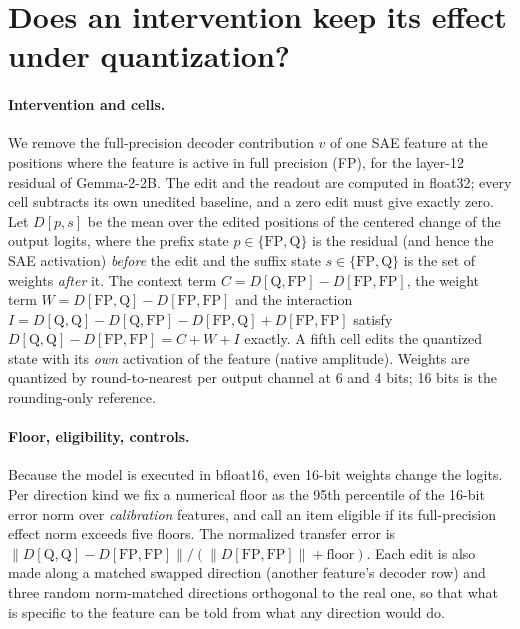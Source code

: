 \section{Does an intervention keep its effect under quantization?}
\label{sec:transfer}

\paragraph{Intervention and cells.}
We remove the full-precision decoder contribution $v$ of one SAE feature at the positions where the feature is active in full precision (FP), for the layer-12 residual of Gemma-2-2B. The edit and the readout are computed in float32; every cell subtracts its own unedited baseline, and a zero edit must give exactly zero. Let $D[p,s]$ be the mean over the edited positions of the centered change of the output logits, where the prefix state $p\in\{\mathrm{FP},\mathrm{Q}\}$ is the residual (and hence the SAE activation) \emph{before} the edit and the suffix state $s\in\{\mathrm{FP},\mathrm{Q}\}$ is the set of weights \emph{after} it. The context term $C=D[\mathrm{Q},\mathrm{FP}]-D[\mathrm{FP},\mathrm{FP}]$, the weight term $W=D[\mathrm{FP},\mathrm{Q}]-D[\mathrm{FP},\mathrm{FP}]$ and the interaction $I=D[\mathrm{Q},\mathrm{Q}]-D[\mathrm{Q},\mathrm{FP}]-D[\mathrm{FP},\mathrm{Q}]+D[\mathrm{FP},\mathrm{FP}]$ satisfy $D[\mathrm{Q},\mathrm{Q}]-D[\mathrm{FP},\mathrm{FP}]=C+W+I$ exactly. A fifth cell edits the quantized state with its \emph{own} activation of the feature (native amplitude). Weights are quantized by round-to-nearest per output channel at 6 and 4 bits; 16 bits is the rounding-only reference.

\paragraph{Floor, eligibility, controls.}
Because the model is executed in bfloat16, even 16-bit weights change the logits. Per direction kind we fix a numerical floor as the 95th percentile of the 16-bit error norm over \emph{calibration} features, and call an item eligible if its full-precision effect norm exceeds five floors. The normalized transfer error is $\lVert D[\mathrm{Q},\mathrm{Q}]-D[\mathrm{FP},\mathrm{FP}]\rVert/(\lVert D[\mathrm{FP},\mathrm{FP}]\rVert+\text{floor})$. Each edit is also made along a matched swapped direction (another feature's decoder row) and three random norm-matched directions orthogonal to the real one, so that what is specific to the feature can be told from what any direction would do.

